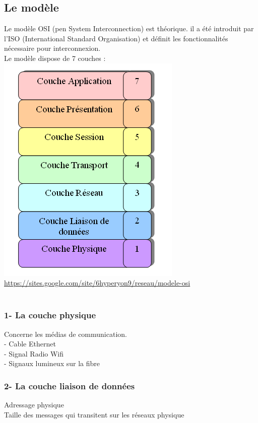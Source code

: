 \documentclass{article}
\begin{document}
\subsection{Le modèle}
Le modèle OSI (pen System Interconnection) est théorique. il a été introduit par l’ISO (International Standard Organisation) et définit les fonctionnalités nécessaire pour interconnexion. \\ 
Le modèle dispose de 7 couches : \\
\includegraphics{image/modeleOSI.PNG} \\
\url{https://sites.google.com/site/6hyperyon9/reseau/modele-osi}
\\
\\
\subsubsection*{1- La couche physique}
Concerne les médias de communication. \\ 
- Cable Ethernet \\
- Signal Radio Wifi \\
- Signaux lumineux sur la fibre \\
\subsubsection*{2- La couche liaison de données}
Adressage physique \\
Taille des messages qui transitent sur les réseaux physique \\
\newpage 
\end{document}

